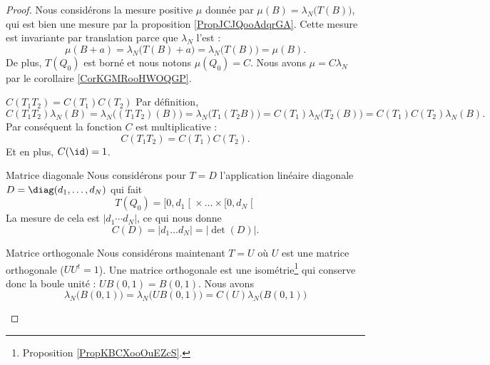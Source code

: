\begin{proof}
    Nous considérons la mesure positive \( \mu\) donnée par \( \mu(B)=\lambda_N\big( T(B) \big)\), qui est bien une mesure par la proposition \ref{PropJCJQooAdqrGA}. Cette mesure est invariante par translation parce que \( \lambda_N\) l'est :
    \begin{equation}
        \mu(B+a)=\lambda_N\big( T(B)+a \big)=\lambda_N\big( T(B) \big)=\mu(B).
    \end{equation}
    De plus, \( T(Q_0)\) est borné et nous notons \( \mu(Q_0)=C\). Nous avons \( \mu=C\lambda_N\) par le corollaire \ref{CorKGMRooHWOQGP}.

    \begin{subproof}
        \item[\( C(T_1T_2)=C(T_1)C(T_2)\)]
            Par définition, 
            \begin{equation}
                C(T_1T_2)\lambda_N(B)=\lambda_N\big( (T_1T_2)(B) \big)=\lambda_N\big( T_1(T_2B) \big)=C(T_1)\lambda_N\big( T_2(B) \big)=C(T_1)C(T_2)\lambda_N(B).
            \end{equation}
            Par conséquent la fonction \( C\) est multiplicative : 
            \begin{equation}
                C(T_1T_2)=C(T_1)C(T_2).
            \end{equation}
            Et en plus, \( C(\id)=1\).
        \item[Matrice diagonale]
            Nous considérons pour \( T=D\) l'application linéaire diagonale \( D=\diag(d_1,\ldots, d_N)\) qui fait
            \begin{equation}
                T(Q_0)=\mathopen[ 0 , d_1 \mathclose[\times \ldots\times \mathopen[  0, d_N \mathclose[
            \end{equation}
            La mesure de cela est \( |d_1\cdots d_N|\), ce qui nous donne
            \begin{equation}
                C(D)=| d_1\ldots d_N |=| \det(D) |.
            \end{equation}
        \item[Matrice orthogonale]
            Nous considérons maintenant \( T=U\) où \( U\) est une matrice orthogonale (\( UU^t=1\)). Une matrice orthogonale est une isométrie\footnote{Proposition \ref{PropKBCXooOuEZcS}.} qui conserve donc la boule unité : \( UB(0,1)=B(0,1)\). Nous avons
            \begin{equation}
                \lambda_N\big( B(0,1) \big)=\lambda_N\big( UB(0,1) \big)=C(U)\lambda_N\big( B(0,1) \big)

\end{equation}
\end{subproof}
\end{proof}
